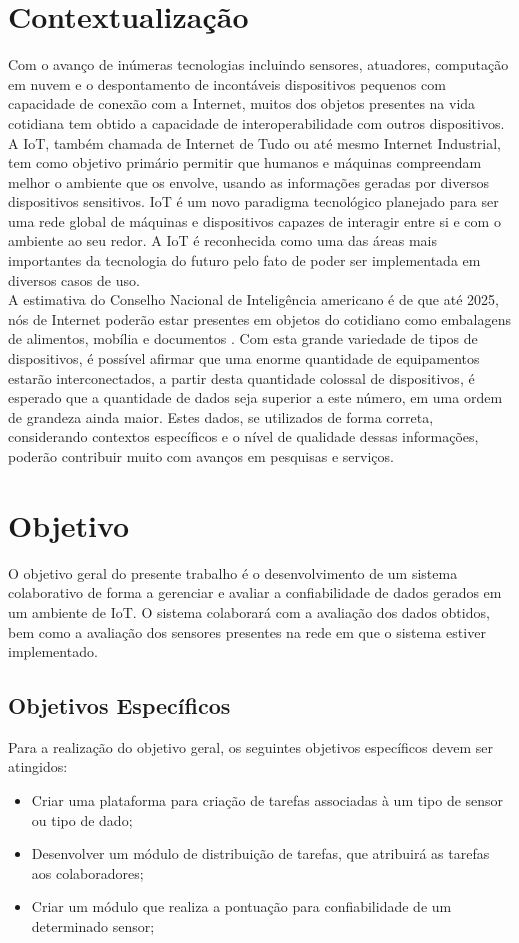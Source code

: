 \section{Contextualização}
\qquad
Com o avanço de inúmeras tecnologias incluindo sensores, atuadores, computação em nuvem e o despontamento de
incontáveis dispositivos pequenos com capacidade de conexão com a Internet, muitos dos objetos presentes
na vida cotidiana tem obtido a capacidade de interoperabilidade com outros dispositivos.
\\ \null
\qquad
A \acrfull{IoT}, também chamada de Internet de Tudo ou até mesmo Internet Industrial, tem como objetivo primário
permitir que humanos e máquinas compreendam melhor o ambiente que os envolve, usando as informações geradas por
diversos dispositivos sensitivos. \acrshort{IoT} é um novo paradigma tecnológico planejado para ser uma rede
global de máquinas e dispositivos capazes de interagir entre si e com o ambiente ao seu redor.
A \acrshort{IoT} é reconhecida como uma das áreas mais importantes da tecnologia do futuro pelo fato de
poder ser implementada em diversos casos de uso.
\\ \null
\qquad A estimativa do Conselho Nacional de Inteligência americano é de que até 2025, nós de Internet poderão estar presentes
em objetos do cotidiano como embalagens de alimentos, mobília e documentos \cite{intelsix}. Com esta grande variedade de tipos de dispositivos,
é possível afirmar que uma enorme quantidade de equipamentos estarão interconectados, a partir desta quantidade
colossal de dispositivos, é esperado que a quantidade de dados seja superior a este número, em uma ordem de grandeza ainda maior.
Estes dados, se utilizados de forma correta, considerando contextos específicos e o nível de qualidade dessas informações, poderão
contribuir muito com avanços em pesquisas e serviços.
\section{Objetivo}
\qquad O objetivo geral do presente trabalho é o desenvolvimento de um sistema colaborativo de forma a gerenciar e avaliar a confiabilidade de dados
gerados em um ambiente de \acrlong{IoT}. O sistema colaborará com a avaliação dos dados obtidos, bem como a avaliação
dos sensores presentes na rede em que o sistema estiver implementado.
\subsection{Objetivos Específicos}
Para a realização do objetivo geral, os seguintes objetivos específicos devem ser atingidos:
\begin{itemize}
  \item Criar uma plataforma para criação de tarefas associadas à um tipo de sensor ou tipo de dado;
  \item Desenvolver um módulo de distribuição de tarefas, que atribuirá as tarefas aos colaboradores;
  \item Criar um módulo que realiza a pontuação para confiabilidade de um determinado sensor;
\end{itemize}
